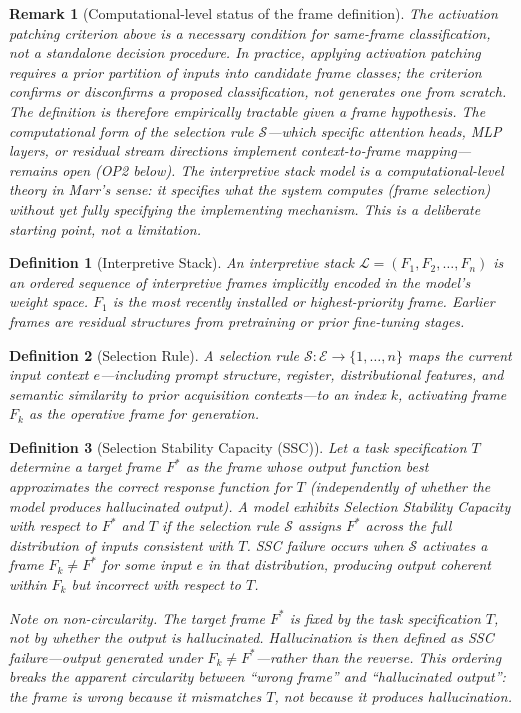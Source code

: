 \documentclass[12pt]{article}
\newtheorem{definition}{Definition}
\newtheorem{remark}{Remark}
\begin{document}
\begin{remark}[Computational-level status of the frame definition]
The activation patching criterion above is a \emph{necessary condition}
for same-frame classification, not a standalone decision procedure.
In practice, applying activation patching requires a prior partition of
inputs into candidate frame classes; the criterion confirms or
disconfirms a proposed classification, not generates one from scratch.
The definition is therefore \emph{empirically tractable given a frame
hypothesis}. The computational form of the selection rule
$\mathcal{S}$---which specific attention heads, MLP layers, or residual
stream directions implement context-to-frame mapping---remains open
(OP2 below). The interpretive stack model is a \emph{computational-level}
theory in Marr's sense: it specifies what the system computes
(frame selection) without yet fully specifying the implementing mechanism.
This is a deliberate starting point, not a limitation.
\end{remark}

\begin{definition}[Interpretive Stack]
An \emph{interpretive stack} $\mathcal{L} = (F_1, F_2, \ldots, F_n)$
is an ordered sequence of interpretive frames implicitly encoded in
the model's weight space. $F_1$ is the most recently installed or
highest-priority frame. Earlier frames are residual structures from
pretraining or prior fine-tuning stages.
\end{definition}

\begin{definition}[Selection Rule]
A \emph{selection rule} $\mathcal{S}: \mathcal{E} \to \{1, \ldots, n\}$
maps the current input context $e$---including prompt structure,
register, distributional features, and semantic similarity to prior
acquisition contexts---to an index $k$, activating frame $F_k$ as
the operative frame for generation.
\end{definition}

\begin{definition}[Selection Stability Capacity (SSC)]
Let a \emph{task specification} $T$ determine a target frame $F^*$
as the frame whose output function best approximates the correct
response function for $T$ (independently of whether the model
produces hallucinated output). A model exhibits
\emph{Selection Stability Capacity} with respect to $F^*$ and $T$
if the selection rule $\mathcal{S}$ assigns $F^*$ across the full
distribution of inputs consistent with $T$. SSC failure occurs when
$\mathcal{S}$ activates a frame $F_k \neq F^*$ for some input $e$
in that distribution, producing output coherent within $F_k$ but
incorrect with respect to $T$.

\emph{Note on non-circularity.} The target frame $F^*$ is fixed by
the task specification $T$, not by whether the output is hallucinated.
Hallucination is then defined as SSC failure---output generated under
$F_k \neq F^*$---rather than the reverse. This ordering breaks the
apparent circularity between ``wrong frame'' and ``hallucinated output'':
the frame is wrong because it mismatches $T$, not because it produces
hallucination.
\end{definition}
\end{document}

